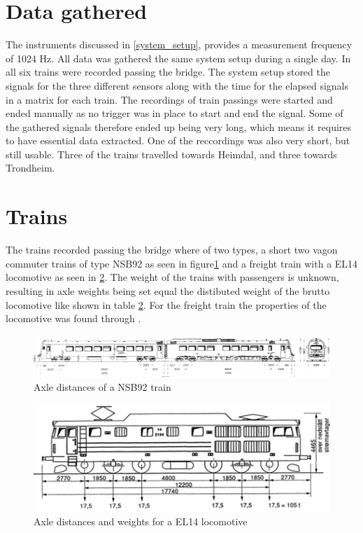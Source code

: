 \section{Data gathered}
The instruments discussed in \ref{system_setup}, provides a measurement frequency of 1024 Hz. All data was gathered the same system setup during a single day.
In all six trains were recorded passing the bridge. The system setup stored the signals for the three different sensors along with the time for the elapsed signals in a matrix for each train. The recordings of train passings were started and ended manually as no trigger was in place to start and end the signal. Some of the gathered signals therefore ended up being very long, which means it requires to have essential data extracted. One of the reccordings was also very short, but still usable.
Three of the trains travelled towards Heimdal, and three towards Trondheim.
\section{Trains}
The trains recorded passing the bridge where of two types, a short two vagon commuter trains of type NSB92 as seen in figure\ref{appendix:nsb92} and a freight train with a EL14 locomotive as seen in \ref{figure:el14_locomotive}. The weight of the trains with passengers is unknown, resulting in axle weights being set equal the distibuted weight of the brutto locomotive like shown in table \ref{}. For the freight train the properties of the locomotive was found through \cite{infoEL14}.
\begin{figure}[H]
	\begin{adjustbox}{center}
		\includegraphics[width=0.8\pagewidth]{./figures/nsb92.png}
	\end{adjustbox}
	\caption{Axle distances of a NSB92 train}
	\label{appendix:nsb92}
\end{figure}

\begin{figure}[H]
	\begin{adjustbox}{center}
		\includegraphics[width=0.8\pagewidth]{./figures/EL14.png}
	\end{adjustbox}
	\caption{Axle distances and weights for a EL14 locomotive}
	\label{figure:el14_locomotive}
\end{figure}

